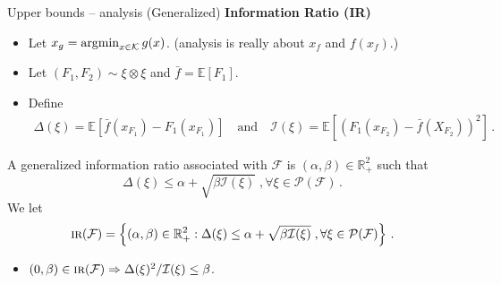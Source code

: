 \documentclass{beamer}
\newcommand{\argmin}{\operatornamewithlimits{argmin}}
\newcommand{\E}{\mathbb{E}}
\newcommand{\R}{\mathbb{R}}
\newcommand{\cK}{\mathcal{K}}
\newcommand{\cF}{\mathcal{F}}
\newcommand{\cP}{\mathcal{P}}
\newcommand{\cI}{\mathcal{I}}
\newcommand{\IR}{\operatorname{\textsc{ir}}}
\begin{document}
\begin{frame}{Upper bounds -- analysis}
    (Generalized) \textbf{Information Ratio (IR)}
    \vspace{0.5em}
    \small
    \begin{itemize}
        \item Let $x_g = \argmin_{x\in\cK} g(x)$. (analysis is really about $x_f$ and $f(x_f)$.)
        \item Let $(F_1, F_2) \sim \xi \otimes \xi$ and $\bar{f} = \E[F_1]$.
        \item Define
              \begin{align*}
                  \Delta(\xi) = \E[\bar{f}(x_{F_1}) - F_1(x_{F_1})]
                  \quad \text{and} \quad \cI(\xi) = \E[(F_1(x_{F_2}) - \bar{f}(X_{F_2}))^2]\,.
              \end{align*}
    \end{itemize}
    \begin{tcolorbox}[title=Generalized IR ,colback=green!5!white,colframe=green!50!black]
        A generalized information ratio associated with $\cF$ is $(\alpha, \beta) \in \R_+^2$ such that
        \[
        \Delta(\xi) \leq \alpha + \sqrt{\beta \cI(\xi)}  \;,\forall \xi\in \cP(\cF)\,.
        \]
        We let
        \[
            \IR(\cF) = \left\{(\alpha, \beta) \in \R_+^2 : \Delta(\xi) \leq \alpha + \sqrt{\beta \cI(\xi)}  \;,\forall \xi\in \cP(\cF) \right\} \,.
        \]
    \end{tcolorbox}
    \begin{itemize}
        \item $(0,\beta) \in \IR(\cF) \Rightarrow \Delta(\xi)^2/\cI(\xi) \leq \beta$.
    \end{itemize}
\end{frame}

\end{document}
